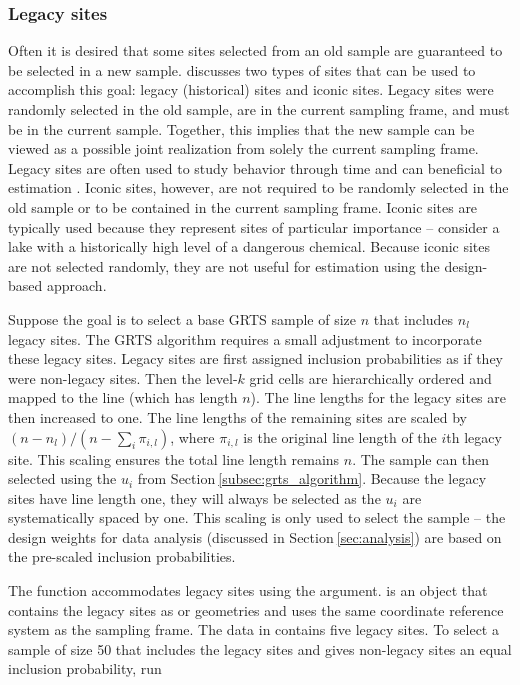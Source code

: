 \documentclass[
  shortnames]{jss}
\begin{document}
\hypertarget{subsubsec:legacy}{%
\subsubsection{Legacy sites}\label{subsubsec:legacy}}

Often it is desired that some sites selected from an old sample are
guaranteed to be selected in a new sample. \citet{foster2017spatially}
discusses two types of sites that can be used to accomplish this goal:
legacy (historical) sites and iconic sites. Legacy sites were randomly
selected in the old sample, are in the current sampling frame, and must
be in the current sample. Together, this implies that the new sample can
be viewed as a possible joint realization from solely the current
sampling frame. Legacy sites are often used to study behavior through
time and can beneficial to estimation \citet{urquhart1999designs}.
Iconic sites, however, are not required to be randomly selected in the
old sample or to be contained in the current sampling frame. Iconic
sites are typically used because they represent sites of particular
importance -- consider a lake with a historically high level of a
dangerous chemical. Because iconic sites are not selected randomly, they
are not useful for estimation using the design-based approach.

Suppose the goal is to select a base GRTS sample of size \(n\) that
includes \(n_l\) legacy sites. The GRTS algorithm requires a small
adjustment to incorporate these legacy sites. Legacy sites are first
assigned inclusion probabilities as if they were non-legacy sites. Then
the level-\(k\) grid cells are hierarchically ordered and mapped to the
line (which has length \(n\)). The line lengths for the legacy sites are
then increased to one. The line lengths of the remaining sites are
scaled by \((n - n_l) /(n - \sum_i \pi_{i, l})\), where \(\pi_{i, l}\)
is the original line length of the \(i\)th legacy site. This scaling
ensures the total line length remains \(n\). The sample can then
selected using the \(u_i\) from Section\(~\)\ref{subsec:grts_algorithm}.
Because the legacy sites have line length one, they will always be
selected as the \(u_i\) are systematically spaced by one. This scaling
is only used to select the sample -- the design weights for data
analysis (discussed in Section\(~\)\ref{sec:analysis}) are based on the
pre-scaled inclusion probabilities.

The  function accommodates legacy sites using the
 argument. \linebreak {} is an
 object that contains the legacy sites as  or
 geometries and uses the same coordinate reference
system as the sampling frame. The \linebreak {} data
in  contains five legacy sites. To select a sample of size
50 that includes the legacy sites and gives non-legacy sites an equal
inclusion probability, run
\end{document}
